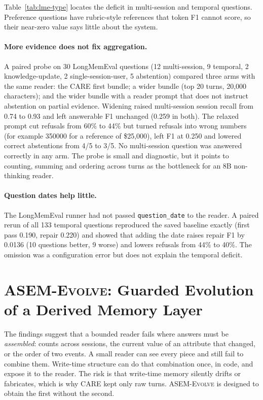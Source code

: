 \documentclass[11pt]{article}
\newcommand{\care}{\textsc{CARE}}
\newcommand{\evolve}{\textsc{ASEM-Evolve}}
\begin{document}
Table~\ref{tab:lme-type} locates the deficit in multi-session and temporal
questions. Preference questions have rubric-style references that token F1
cannot score, so their near-zero value says little about the system.

\paragraph{More evidence does not fix aggregation.}
A paired probe on 30 LongMemEval questions (12 multi-session, 9 temporal, 2
knowledge-update, 2 single-session-user, 5 abstention) compared three arms with
the same reader: the \care{} first bundle; a wider bundle (top 20 turns, 20,000
characters); and the wider bundle with a reader prompt that does not instruct
abstention on partial evidence. Widening raised multi-session session recall
from 0.74 to 0.93 and left answerable F1 unchanged (0.259 in both). The
relaxed prompt cut refusals from 60\% to 44\% but turned refusals into wrong
numbers (for example 350000 for a reference of \$25,000), left F1 at 0.250 and
lowered correct abstentions from 4/5 to 3/5. No multi-session question was
answered correctly in any arm. The probe is small and diagnostic, but it points
to counting, summing and ordering across turns as the bottleneck for an 8B
non-thinking reader.

\paragraph{Question dates help little.}
The LongMemEval runner had not passed \texttt{question\_date} to the reader. A
paired rerun of all 133 temporal questions reproduced the saved baseline exactly
(first pass 0.190, repair 0.220) and showed that adding the date raises repair
F1 by 0.0136 (10 questions better, 9 worse) and lowers refusals from 44\% to
40\%. The omission was a configuration error but does not explain the temporal
deficit.

\section{\evolve{}: Guarded Evolution of a Derived Memory Layer}
\label{sec:evolve}

The findings suggest that a bounded reader fails where answers must be
\emph{assembled}: counts across sessions, the current value of an attribute
that changed, or the order of two events. A small reader can see every piece and
still fail to combine them. Write-time structure can do that combination once,
in code, and expose it to the reader. The risk is that write-time memory
silently drifts or fabricates, which is why \care{} kept only raw turns.
\evolve{} is designed to obtain the first without the second.
\end{document}
